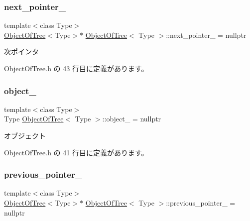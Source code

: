 \subsubsection{\texorpdfstring{next\+\_\+pointer\+\_\+}{next\_pointer\_}}
{\footnotesize\ttfamily template$<$class Type$>$ \\
\mbox{\hyperlink{class_object_of_tree}{Object\+Of\+Tree}}$<$Type$>$$\ast$ \mbox{\hyperlink{class_object_of_tree}{Object\+Of\+Tree}}$<$ Type $>$\+::next\+\_\+pointer\+\_\+ = nullptr\hspace{0.3cm}{\ttfamily [private]}}



次ポインタ 



 Object\+Of\+Tree.\+h の 43 行目に定義があります。

\mbox{\label{class_object_of_tree_ad3ce36879f78ba2c2171385a8428c7ba}} 
\subsubsection{\texorpdfstring{object\+\_\+}{object\_}}
{\footnotesize\ttfamily template$<$class Type$>$ \\
Type \mbox{\hyperlink{class_object_of_tree}{Object\+Of\+Tree}}$<$ Type $>$\+::object\+\_\+ = nullptr\hspace{0.3cm}{\ttfamily [private]}}



オブジェクト 



 Object\+Of\+Tree.\+h の 41 行目に定義があります。

\mbox{\label{class_object_of_tree_a77243aefc3b9766b6dcf28ec713eef8e}} 
\subsubsection{\texorpdfstring{previous\+\_\+pointer\+\_\+}{previous\_pointer\_}}
{\footnotesize\ttfamily template$<$class Type$>$ \\
\mbox{\hyperlink{class_object_of_tree}{Object\+Of\+Tree}}$<$Type$>$$\ast$ \mbox{\hyperlink{class_object_of_tree}{Object\+Of\+Tree}}$<$ Type $>$\+::previous\+\_\+pointer\+\_\+ = nullptr\hspace{0.3cm}{\ttfamily [private]}}



